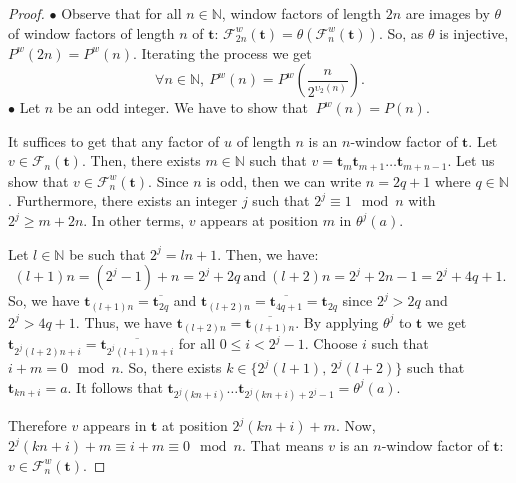\documentclass[a4 paper,12pt]{article}
\begin{document}
\begin{proof} 
 $\bullet$ Observe that for all $n\in \mathbb{N}$, window factors of length $2n$ are images by $\theta$ of window factors of length $n$ of $\mathbf{t}$: $\mathcal{F}^{w}_{2n}(\mathbf{t})=\theta\left(\mathcal{F}^{w}_{n}(\mathbf{t})\right)$. So,  as $\theta$ is injective,
  $P^{w}( 2n)=P^{w}( n)$. Iterating the process we get
 $$\forall n\in \mathbb{N},\ P^w( n)=P^{w}\left(\frac{n}{2^{\upsilon_2\left(n\right)}}\right).$$
                       $\bullet$ Let $n$ be an   odd integer. We have to show that
  $\ P^w(n)=P\left(n\right).$

It suffices to get that any factor of $u$ of length $n$ is an $n$-window factor of $\mathbf{t}$. Let $v\in \mathcal{F}_n(\mathbf{t})$. Then, there exists $m\in \mathbb{N}$ such that $v=\mathbf{t}_{m}\mathbf{t}_{m+1}\ldots \mathbf{t}_{m+n-1}$. Let us show that $v\in \mathcal{F}^{w}_{n}(\mathbf{t})$. 
   Since $n$ is odd, then we can write $n=2q+1$ where $q\in \mathbb{N}$. Furthermore, there exists an integer $j$ such that $2^j\equiv 1\mod n$ with $2^j\geq m+2n$. In other terms, $v$ appears at position $m$ in $\theta^{j}(a)$. 
   
   
   
Let   $l\in \mathbb{N}$ be such that $2^j=ln+1$. Then, we have:
 $$(l+1)n=(2^j-1)+n=2^j+2q \ \mathrm{and} \ (l+2)n=2^j+2n-1=2^j+4q+1.$$
  So, we have  $\mathbf{t}_{(l+1)n}=\overline{\mathbf{t}_{2q}}$ and $\mathbf{t}_{(l+2)n}=\overline{\mathbf{t}_{4q+1}}=\mathbf{t}_{2q}$ since  $2^j>2q$ and $2^j>4q+1$.
 Thus, we have $\mathbf{t}_{(l+2)n}=\overline{\mathbf{t}_{(l+1)n}}$. By applying $\theta^j$ to $\mathbf{t}$ we get $\mathbf{t}_{2^{j}(l+2)n+i}=\overline{\mathbf{t}_{2^{j}(l+1)n+i}}$ for all  $0\leq i< 2^j-1$. Choose $i$  such that $i+m=0\mod n$.  So, there exists $k\in \lbrace2^{j}(l+1),\, 2^{j}(l+2)\rbrace$ such that $\mathbf{t}_{kn+i}=a$. It follows that
 $\mathbf{t}_{2^{j}(kn+i)}\ldots \mathbf{t}_{2^{j}\left( kn+i\right)+2^j-1 }=\theta ^{j}(a)$.
 
  Therefore $v$ appears in $\mathbf{t}$ at position $2^{j}(kn+i)+m$. 
 Now, $2^{j}(kn+i)+m\equiv i+m \equiv 0\mod n$.
 That means $v$ is an $n$-window factor of $\mathbf{t}$: $v\in \mathcal{F}^{w}_{n}(\mathbf{t})$.
 
%
  \end{proof}
\end{document}
